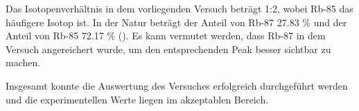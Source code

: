 Das Isotopenverhältnis in dem vorliegenden Versuch beträgt 1:2, wobei Rb-85 das häufigere Isotop ist.
In der Natur beträgt der Anteil von Rb-87 27.83 \% und der Anteil von Rb-85 72.17 \% (\cite{rubidium}).
Es kann vermutet werden, dass Rb-87 in dem Versuch angereichert wurde, um den entsprechenden Peak besser sichtbar zu machen.



Insgesamt konnte die Auswertung des Versuches erfolgreich durchgeführt werden und die experimentellen Werte liegen im akzeptablen Bereich.
